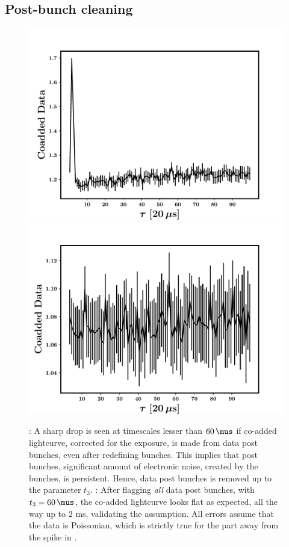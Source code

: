 \subsection{Post-bunch cleaning}
\label{subsec:post-bunch_clean}

\begin{figure}
\begin{center}
\includegraphics[scale=0.42]{GRB160802A--Q1--LC--raw_data}
\includegraphics[scale=0.42]{GRB160802A--Q1--LC--after_new_bunchclean}
\caption[The remnant effect of \textbf{cztbunchclean}]{\eL: A sharp drop is seen at timescales lesser than $60 \, \mus$ if co-added lightcurve, corrected for the exposure, is made from data post bunches, even after redefining bunches. This implies that post bunches, significant amount of electronic noise, created by the bunches, is persistent. Hence, data post bunches is removed up to the parameter $t_3$. \eR: After flagging \emph{all} data post bunches, with $t_3 = 60 \, \mus$, the co-added lightcurve looks flat as expected, all the way up to $2$ ms, validating the assumption. All errors assume that the data is Poissonian, which is strictly true for the part away from the spike in \eL.}
\label{fig:postbunch_flagging}
\end{center}
\end{figure}


